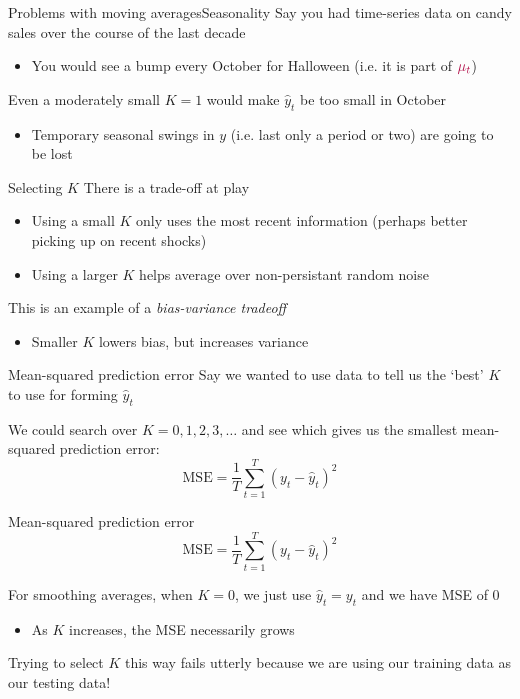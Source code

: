 \documentclass[aspectratio=169,t,11pt,table]{beamer}
\begin{document}
\begin{frame}{Problems with moving averages}{Seasonality}
  Say you had time-series data on candy sales over the course of the last decade
  \begin{itemize}
    \item You would see a bump every October for Halloween (i.e. it is part of ${\color[HTML]{B3114B} \mu_t}$)
  \end{itemize}

  \bigskip
  Even a moderately small $K = 1$ would make $\hat{y}_t$ be too small in October
  \begin{itemize}
    \item Temporary seasonal swings in $y$ (i.e. last only a period or two) are going to be lost
  \end{itemize}
\end{frame}

\begin{frame}{Selecting $K$}
  There is a trade-off at play
  \begin{itemize}
    \item Using a small $K$ only uses the most recent information (perhaps better picking up on recent shocks)
    
    \item Using a larger $K$ helps average over non-persistant random noise
  \end{itemize}

  \pause
  \bigskip
  This is an example of a \emph{bias-variance tradeoff}
  \begin{itemize}
    \item Smaller $K$ lowers bias, but increases variance
  \end{itemize}
\end{frame}

\begin{frame}{Mean-squared prediction error}
  Say we wanted to use data to tell us the `best' $K$ to use for forming $\hat{y}_t$

  \bigskip
  We could search over $K = 0, 1, 2, 3, \dots$ and see which gives us the smallest mean-squared prediction error:
  $$
    \text{MSE} = \frac{1}{T} \sum_{t=1}^T (y_t - \hat{y}_t)^2
  $$
\end{frame}

\begin{frame}{Mean-squared prediction error}
  \vspace*{-\bigskipamount}
  $$
    \text{MSE} = \frac{1}{T} \sum_{t=1}^T (y_t - \hat{y}_t)^2
  $$
  
  \bigskip
  For smoothing averages, when $K = 0$, we just use $\hat{y}_t = y_t$ and we have MSE of $0$
  \begin{itemize}
    \item As $K$ increases, the MSE necessarily grows
  \end{itemize}

  \bigskip
  Trying to select $K$ this way fails utterly because we are using our training data as our testing data!
\end{frame}
\end{document}
